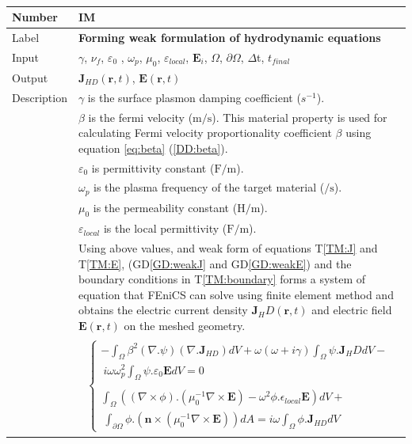 \documentclass[12pt]{article}
\newcommand{\colAwidth}{0.13\textwidth}
\newcommand{\colBwidth}{0.82\textwidth}
\newcounter{instnum} %
\begin{document}
~\newline
\noindent
\begin{minipage}{\textwidth}
	\renewcommand*{\arraystretch}{1.5}
	\begin{tabular}{| p{\colAwidth} | p{\colBwidth}|}
		\hline
		\rowcolor[gray]{0.9}
		Number& IM{instnum}\theinstnum \label{IM:solve}\\
		\hline
		Label& \bf Forming weak formulation of hydrodynamic equations\\
		\hline
		Input& $\gamma$, $\nu_f$, $\varepsilon_0$ , $\omega_p$, $\mu_{0}$, $\varepsilon_{local}$, $\textbf{E}_i$, $\Omega$, $\partial \Omega$, $\Delta$t, $t_{final}$
		\\
		\hline
		Output&  $\textbf{J}_{HD}(\textbf{r},t)$, $\textbf{E}(\textbf{r},t)$ \\
		\hline
		Description
		& $\gamma$ is the surface plasmon damping coefficient ($s^{-1}$).\\ 
		& $\beta$ is the fermi velocity ($\si{\meter \per \second}$). This material property is used for calculating Fermi velocity proportionality coefficient $\beta$ using equation \ref{eq:beta}  (\ref{DD:beta}).\\
		& $\varepsilon_{0}$ is permittivity constant ($\si{\farad \per \meter}$). \\
		& $\omega_p$ is the plasma frequency of the target material ($\si{\per \second}$).\\
		& $\mu_{0}$ is the permeability constant ($\si{\henry \per \meter}$). \\
		& $\varepsilon_{local}$ is the local permittivity ($\si{\farad \per \meter}$).\\
		& Using above values, and weak form of equations T\ref{TM:J} and T\ref{TM:E}, (GD\ref{GD:weakJ} and GD\ref{GD:weakE}) and the boundary conditions in T\ref{TM:boundary} forms a system of equation that FEniCS can solve using finite element method and obtains the electric current density $\textbf{J}_HD(\textbf{r},t)$ and electric field $\textbf{E}(\textbf{r},t)$ on the meshed geometry.\\
		
		&	\begin{equation}
			\label{eq:boundary}
			\begin{gathered}
				\begin{cases}	
					
					-\int_\Omega \beta^2(\nabla.\psi)(\nabla.\textbf{J}_{HD})dV+\omega(\omega+i\gamma)\int_{\Omega} \psi. \textbf{J}_HD dV - \\ \ i\omega \omega^2_p \int_\Omega \psi.\varepsilon_{0}\textbf{E}dV = 0 
					\\
					\\
					\int_\Omega ((\nabla \times \phi) . (\mu^{-1}_0 \nabla \times \textbf{E})-\omega^2 \phi.\epsilon_{local} \textbf{E}) dV + \\ \ \int_{\partial \Omega} \phi.(\textbf{n} \times (\mu^{-1}_0 \nabla \times \textbf{E}))dA = i\omega \int_\Omega \phi. \textbf{J}_{HD} dV 
					

\end{cases}
\end{gathered}
\end{equation}
\end{tabular}
\end{minipage}
\end{document}
